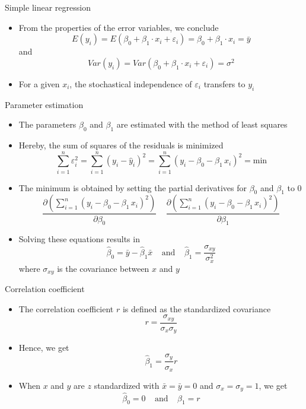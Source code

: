 \documentclass[aspectratio=169]{beamer}
\begin{document}
\begin{frame}{Simple linear regression}
  \begin{itemize}
    \item From the properties of the error variables, we conclude
\[
  E(y_i) = E(\beta_0 + \beta_1 \cdot x_i + \varepsilon_i) =
  \beta_0 + \beta_1 \cdot x_i = \bar{y}
\]
and
\[
  Var(y_i) = Var(\beta_0 + \beta_1 \cdot x_i + \varepsilon_i) = \sigma^2
\]
\item For a given $x_i$, the stochastical independence of $\varepsilon_i$
  transfers to $y_i$\\[2ex]
  \end{itemize}
\end{frame}

\begin{frame}{Parameter estimation}
  \begin{itemize}
    \item The parameters $\beta_0$ and $\beta_1$ are estimated with the method
      of least squares
    \item Hereby, the sum of squares of the residuals is minimized
      \[
        \sum_{i=1}^n \varepsilon_i^2
        = \sum_{i=1}^n (y_i - \hat{y}_i)^2
        = \sum_{i=1}^n (y_i - \beta_0 - \beta_1 \, x_i)^2
        = \text{min}
      \]
    \item The minimum is obtained by setting the partial derivatives for
      $\beta_0$ and $\beta_1$ to 0
      \[
        \frac{\partial \left( \sum_{i=1}^n (y_i - \beta_0 - \beta_1 \, x_i)^2\right)}
        {\partial \beta_0}  ~~~~~
        \frac{\partial \left( \sum_{i=1}^n (y_i - \beta_0 - \beta_1 \, x_i)^2\right)}
        {\partial \beta_1} 
      \]
    \item Solving these equations results in
      \[
        \hat\beta_0 = \bar y - \hat\beta_1 \bar x ~~~~~ \text{and} ~~~~~
        \hat\beta_1 = \frac{\sigma_{xy}}{\sigma^2_{x}}
      \]
      where $\sigma_{xy}$ is the covariance between $x$ and $y$
  \end{itemize}
\end{frame}

\begin{frame}{Correlation coefficient}
  \begin{itemize}
    \item The correlation coefficient $r$ is defined as the standardized
      covariance
      \[
        r = \frac{\sigma_{xy}}{\sigma_x \sigma_y}
      \]
    \item Hence, we get
      \[
        \hat\beta_1 = \frac{\sigma_{y}}{\sigma_x} r
      \]
    \item When $x$ and $y$ are $z$ standardized with $\bar x = \bar y = 0$ and
      $\sigma_x = \sigma_y = 1$, we get
      \[
        \hat\beta_0 = 0 ~~~~~ \text{and} ~~~~~ \beta_1 = r
      \]
  \end{itemize}
\end{frame}
\end{document}
